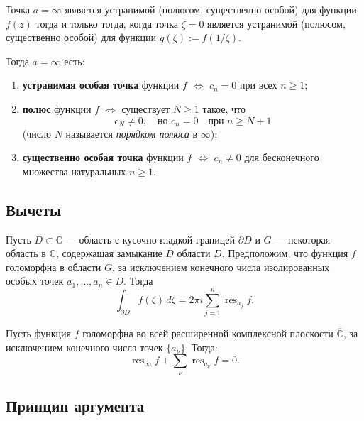 \begin{theorem}
  Точка $a = \infty$ является устранимой (полюсом, существенно особой) для функции $f(z)$ тогда и только тогда, когда точка $\zeta = 0$ является устранимой (полюсом, существенно особой) для функции $g(\zeta) := f(1/\zeta)$.

  Тогда $a = \infty$ есть:
  \begin{enumerate}
      \item \textbf{устранимая особая точка} функции $f$ $\iff$ $c_n = 0$ при всех $n \geq 1$;
      \item \textbf{полюс} функции $f$ $\iff$ существует $N \geq 1$ такое, что
      \[
      c_N \neq 0, \quad \text{но } c_n = 0 \quad \text{при } n \geq N + 1
      \]
      (число $N$ называется \emph{порядком полюса} в $\infty$);
      \item \textbf{существенно особая точка} функции $f$ $\iff$ $c_n \neq 0$ для бесконечного множества натуральных $n \geq 1$.
  \end{enumerate}
\end{theorem}

\subsection{Вычеты}

\begin{theorem}
Пусть $D \subset \mathbb{C}$ --- область с кусочно-гладкой границей $\partial D$ и $G$ --- некоторая область в $\mathbb{C}$, содержащая замыкание $\overline{D}$ области $D$. Предположим, что функция $f$ голоморфна в области $G$, за исключением конечного числа изолированных особых точек $a_1, \ldots, a_n \in D$. Тогда
\[
\int_{\partial D} f(\zeta) \, d\zeta = 2\pi i \sum_{j=1}^{n} \operatorname{res}_{a_j} f.
\]
\end{theorem}

\begin{theorem}
Пусть функция $f$ голоморфна во всей расширенной комплексной плоскости $\overline{\mathbb{C}}$, за исключением конечного числа точек $\{a_\nu\}$. Тогда:
\[
\operatorname{res}_{\infty} f + \sum_{\nu} \operatorname{res}_{a_\nu} f = 0.
\]
\end{theorem}

\subsection{Принцип аргумента}

